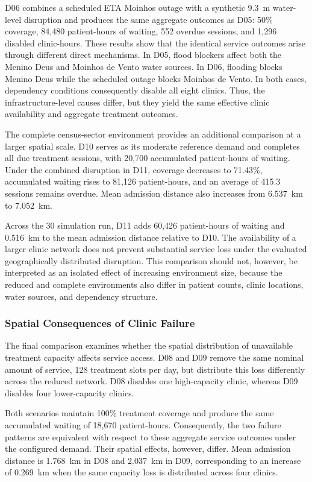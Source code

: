 D06 combines a scheduled ETA Moinhos outage with a synthetic 9.3~m water-level disruption and produces the same aggregate outcomes as D05: 50\% coverage, 84,480 patient-hours of waiting, 552 overdue sessions, and 1,296 disabled clinic-hours. These results show that the identical service outcomes arise through different direct mechanisms. In D05, flood blockers affect both the Menino Deus and Moinhos de Vento water sources. In D06, flooding blocks Menino Deus while the scheduled outage blocks Moinhos de Vento. In both cases, dependency conditions consequently disable all eight clinics. Thus, the infrastructure-level causes differ, but they yield the same effective clinic availability and aggregate treatment outcomes.

The complete census-sector environment provides an additional comparison at a larger spatial scale. D10 serves as its moderate reference demand and completes all due treatment sessions, with 20,700 accumulated patient-hours of waiting. Under the combined disruption in D11, coverage decreases to 71.43\%, accumulated waiting rises to 81,126 patient-hours, and an average of 415.3 sessions remains overdue. Mean admission distance also increases from 6.537~km to 7.052~km.

Across the 30 simulation run, D11 adds 60,426 patient-hours of waiting and 0.516~km to the mean admission distance relative to D10. The availability of a larger clinic network does not prevent substantial service loss under the evaluated geographically distributed disruption. This comparison should not, however, be interpreted as an isolated effect of increasing environment size, because the reduced and complete environments also differ in patient counts, clinic locations, water sources, and dependency structure.


\subsubsection{Spatial Consequences of Clinic Failure}
\label{sec:results_dialysis_spatial}

The final comparison examines whether the spatial distribution of unavailable treatment capacity affects service access. D08 and D09 remove the same nominal amount of service, 128 treatment slots per day, but distribute this loss differently across the reduced network. D08 disables one high-capacity clinic, whereas D09 disables four lower-capacity clinics.

Both scenarios maintain 100\% treatment coverage and produce the same accumulated waiting of 18,670 patient-hours. Consequently, the two failure patterns are equivalent with respect to these aggregate service outcomes under the configured demand. Their spatial effects, however, differ. Mean admission distance is 1.768~km in D08 and 2.037~km in D09, corresponding to an increase of 0.269~km when the same capacity loss is distributed across four clinics.

